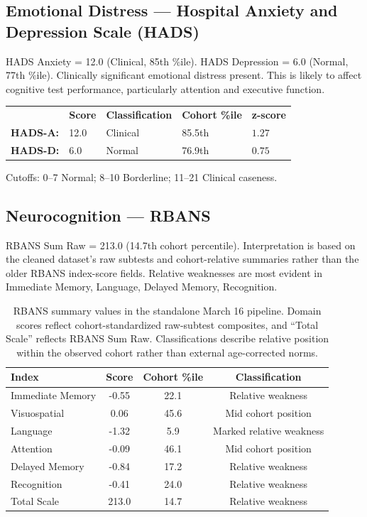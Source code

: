 \documentclass[11pt,a4paper]{article}
\begin{document}
\subsection{Emotional Distress --- Hospital Anxiety and Depression Scale (HADS)}
HADS Anxiety = 12.0 (Clinical, 85th \%ile). HADS Depression = 6.0 (Normal, 77th \%ile). Clinically significant emotional distress present. This is likely to affect cognitive test performance, particularly attention and executive function.

\noindent\begin{tabular}{lllll}
 & \textbf{Score} & \textbf{Classification} & \textbf{Cohort \%ile} & \textbf{z-score} \\
\textbf{HADS-A:} & 12.0 & Clinical & 85.5th & $1.27$ \\
\textbf{HADS-D:} & 6.0 & Normal & 76.9th & $0.75$ \\
\end{tabular}

\smallskip\noindent\small Cutoffs: 0--7 Normal; 8--10 Borderline; 11--21 Clinical caseness.

\subsection{Neurocognition --- RBANS}
RBANS Sum Raw = 213.0 (14.7th cohort percentile). Interpretation is based on the cleaned dataset's raw subtests and cohort-relative summaries rather than the older RBANS index-score fields. Relative weaknesses are most evident in Immediate Memory, Language, Delayed Memory, Recognition. 

\begin{table}[H]
\centering\small
\begin{tabular}{lccc}
\toprule
\textbf{Index} & \textbf{Score} & \textbf{Cohort \%ile} & \textbf{Classification} \\
\midrule
    Immediate Memory & -0.55 & 22.1 & Relative weakness \\
    Visuospatial & 0.06 & 45.6 & Mid cohort position \\
    Language & -1.32 & 5.9 & Marked relative weakness \\
    Attention & -0.09 & 46.1 & Mid cohort position \\
    Delayed Memory & -0.84 & 17.2 & Relative weakness \\
    Recognition & -0.41 & 24.0 & Relative weakness \\
    Total Scale & 213.0 & 14.7 & Relative weakness \\
\bottomrule
\end{tabular}
\caption{RBANS summary values in the standalone March 16 pipeline. Domain scores reflect cohort-standardized raw-subtest composites, and ``Total Scale'' reflects RBANS Sum Raw. Classifications describe relative position within the observed cohort rather than external age-corrected norms.}
\end{table}
\end{document}

